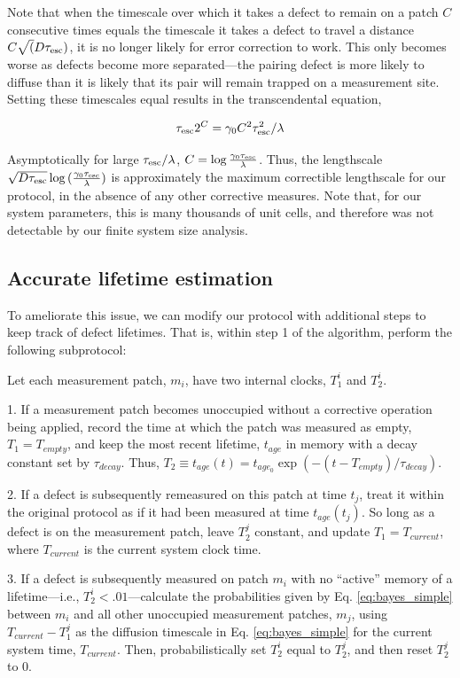 \documentclass[twocolumn,superscriptaddress,aps,prb,floatfix]{revtex4-1}
\newcommand{\te}{\tau_{\rm{esc}}}
\begin{document}
Note that when the timescale over which it takes a defect to remain on a patch $C$ consecutive times equals the timescale it takes a defect to travel a distance $C \sqrt(D \te)$, it is no longer likely for error correction to work.  This only becomes worse as defects become more separated---the pairing defect is more likely to diffuse than it is likely that its pair will remain trapped on a measurement site.  Setting these timescales equal results in the transcendental equation,

\begin{equation}
\te 2^C = \gamma_0 C^2 \te^2 / \lambda
\end{equation}

Asymptotically for large $\te/\lambda$, $C=\log{\frac{\gamma_0\te}{\lambda}}$.  Thus, the lengthscale $\sqrt{D \te} \log{(\frac{\gamma_0\te}{\lambda})}$ is approximately the maximum correctible lengthscale for our protocol, in the absence of any other corrective measures.  Note that, for our system parameters, this is many thousands of unit cells, and therefore was not detectable by our finite system size analysis.

\subsection{Accurate lifetime estimation}

To ameliorate this issue, we can modify our protocol with additional steps to keep track of defect lifetimes.  That is, within step 1 of the algorithm, perform the following subprotocol:

Let each measurement patch, $m_i$, have two internal clocks, $T^i_1$ and $T^i_2$.

1. If a measurement patch becomes unoccupied without a corrective operation being applied, record the time at which the patch was measured as empty, $T_1=T_{empty}$, and keep the most recent lifetime, $t_{age}$ in memory with a decay constant set by $\tau_{decay}$.  Thus, $T_2 \equiv t_{age}(t) = t_{age_0}\exp(-(t-T_{empty})/\tau_{decay})$.

2. If a defect is subsequently remeasured on this patch at time $t_j$, treat it within the original protocol as if it had been measured at time $t_{age}(t_j)$.  So long as a defect is on the measurement patch, leave $T^j_2$ constant, and update $T_1 = T_{current}$, where $T_{current}$ is the current system clock time.

3. If a defect is subsequently measured on patch $m_i$ with no ``active'' memory of a lifetime---i.e., $T^i_2<.01$---calculate the probabilities given by Eq. \ref{eq:bayes_simple} between $m_i$ and all other unoccupied measurement patches, $m_j$, using $T_{current} - T^j_1$ as the diffusion timescale in Eq. \ref{eq:bayes_simple} for the current system time, $T_{current}$.  Then, probabilistically set $T^i_2$ equal to $T^j_2$, and then reset $T^j_2$ to $0$.
\end{document}
